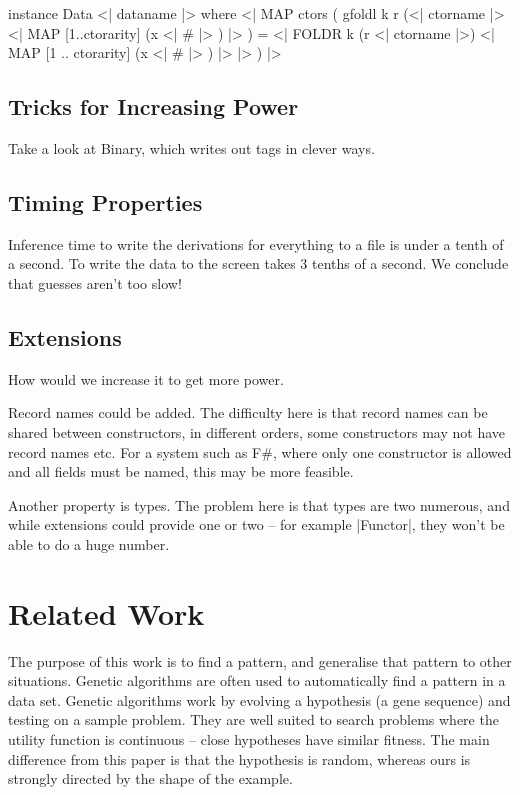 \documentclass[preprint,draft]{sigplanconf}
\begin{document}
\ignore\begin{code}
instance Data \? <| dataname |> where
    <| MAP ctors (
        gfoldl k r
            (<| ctorname |> \? <| MAP [1..ctorarity] (x <| # |> ) |> ) =
            <| FOLDR k (r \? <| ctorname |>)
                <| MAP [1 .. ctorarity] (x <| # |> ) |>
            |>
    ) |>
\end{code}

\subsection{Tricks for Increasing Power}

Take a look at Binary, which writes out tags in clever ways.

\subsection{Timing Properties}

Inference time to write the derivations for everything to a file is under a tenth of a second. To write the data to the screen takes 3 tenths of a second. We conclude that guesses aren't too slow!

\subsection{Extensions}
\label{sec:extensions}

How would we increase it to get more power.

Record names could be added. The difficulty here is that record names can be shared between constructors, in different orders, some constructors may not have record names etc. For a system such as F\#, where only one constructor is allowed and all fields must be named, this may be more feasible.

Another property is types. The problem here is that types are two numerous, and while extensions could provide one or two -- for example |Functor|, they won't be able to do a huge number.

\section{Related Work}
\label{sec:related}

The purpose of this work is to find a pattern, and generalise that pattern to other situations. Genetic algorithms \cite{genetic_algorithms} are often used to automatically find a pattern in a data set. Genetic algorithms work by evolving a hypothesis (a gene sequence) and testing on a sample problem. They are well suited to search problems where the utility function is continuous -- close hypotheses have similar fitness. The main difference from this paper is that the hypothesis is random, whereas ours is strongly directed by the shape of the example.
\end{document}
